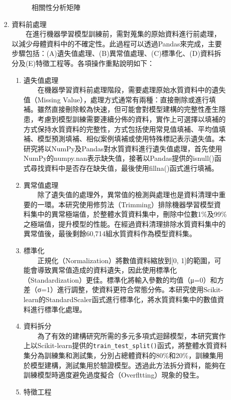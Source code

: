 \documentclass[12pt,a4paper]{article}
\begin{document}
\begin{enumerate}
\begin{enumerate}[label=\arabic*.]
\begin{enumerate}[label=2-2-\arabic*.]
\begin{figure}[H]
                \caption{相關性分析矩陣}
                \label{fig:correlation_matrix}
            \end{figure}
        \item 資料前處理\\
        　　在進行機器學習模型訓練前，需對蒐集的原始資料進行前處理，以減少母體資料中的不確定性。此過程可以透過Pandas來完成，主要步驟包括：(A)遺失值處理、(B)異常值處理、(C)標準化、(D)資料拆分及(E)特徵工程等。各項操作重點說明如下：
            \begin{enumerate}[label=\Alph*.]
                \item 遺失值處理\\
                　　在機器學習資料前處理階段，需要處理原始水質資料中的遺失值（Missing Value），處理方式通常有兩種：直接刪除或進行填補。雖然直接刪除較為快速，但可能會對模型建構的完整性產生隱患，考慮到模型訓練需要連續分佈的資料，實作上可選擇以填補的方式保持水質資料的完整性，方式包括使用常見值填補、平均值填補、模型預測填補、相似案例填補或使用特殊標記表示遺失值\cite{ref24}。本研究將以NumPy及Pandas對水質資料進行遺失值處理，首先使用NumPy的numpy.nan表示缺失值，接著以Pandas提供的isnull()函式尋找資料中是否存在缺失值，最後使用fillna()函式進行填補。
                \item 異常值處理\\
                　　除了遺失值的處理外，異常值的檢測與處理也是資料清理中重要的一環。本研究使用修剪法（Trimming）排除機器學習模型資料集中的異常極端值，於整體水質資料集中，刪除中位數1\%及99\%之極端值，提升模型的性能\cite{ref25}。在經過資料清理排除水質資料集中的異常值後，最後剩餘60,714組水質資料作為模型資料集。
                \item 標準化\\
                　　正規化（Normalization）將數值資料縮放到[0, 1]的範圍，可能會導致異常值造成的資料遺失，因此使用標準化（Standardization）更佳。標準化將輸入參數的均值（μ=0）和方差（σ=1）進行調整，使資料更符合常態分佈\cite{ref26}。本研究使用Scikit-learn的StandardScaler函式進行標準化，將水質資料集中的數值資料進行標準化處理。
                \item 資料拆分\\
                　　為了有效的建構研究所需的多元多項式迴歸模型，本研究實作上以Scikit-learn提供的\texttt{train\_test\_split()}函式，將整體水質資料集分為訓練集和測試集，分別占總體資料的80\%和20\%，訓練集用於模型建構，測試集用於驗證模型\cite{ref27}。透過此方法拆分資料，能夠在訓練模型時適度避免過度擬合（Overfltting）現象的發生。
                \item 特徵工程\\

\end{enumerate}
\end{enumerate}
\end{enumerate}
\end{enumerate}
\end{document}
